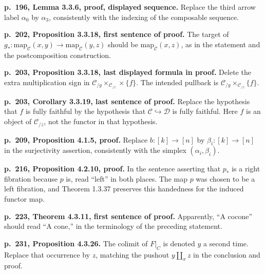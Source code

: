 \par{}
\noindent\textbf{p.~196, Lemma 3.3.6, proof, displayed sequence.}\enspace
Replace the third arrow label $\alpha_0$ by $\alpha_3$, consistently with the indexing of the composable sequence.

\par{}
\noindent\textbf{p.~202, Proposition 3.3.18, first sentence of proof.}\enspace
The target of $g_*\colon\mathrm{map}_{\mathcal C}(x,y)\to\mathrm{map}_{\mathcal C}(y,z)$ should be $\mathrm{map}_{\mathcal C}(x,z)$, as in the statement and the postcomposition construction.

\par{}
\noindent\textbf{p.~203, Proposition 3.3.18, last displayed formula in proof.}\enspace
Delete the extra multiplication sign in $\mathcal C_{/g}\times_{\mathcal C_{/z}}\times\{f\}$. The intended pullback is $\mathcal C_{/g}\times_{\mathcal C_{/z}}\{f\}$.

\par{}
\noindent\textbf{p.~203, Corollary 3.3.19, last sentence of proof.}\enspace
Replace the hypothesis that $f$ is fully faithful by the hypothesis that $\mathcal C\hookrightarrow\mathcal D$ is fully faithful. Here $f$ is an object of $\mathcal C_{/z}$, not the functor in that hypothesis.

\par{}
\noindent\textbf{p.~209, Proposition 4.1.5, proof.}\enspace
Replace $b\colon[k]\to[n]$ by $\beta_i\colon[k]\to[n]$ in the surjectivity assertion, consistently with the simplex $(\alpha_i,\beta_i)$.

\par{}
\noindent\textbf{p.~216, Proposition 4.2.10, proof.}\enspace
In the sentence asserting that $p_*$ is a right fibration because $p$ is, read ``left'' in both places. The map $p$ was chosen to be a left fibration, and Theorem 1.3.37 preserves this handedness for the induced functor map.

\par{}
\noindent\textbf{p.~223, Theorem 4.3.11, first sentence of proof.}\enspace
Apparently, ``A cocone'' should read ``A cone,'' in the terminology of the preceding statement.

\par{}
\noindent\textbf{p.~231, Proposition 4.3.26.}\enspace
The colimit of $F|_C$ is denoted $y$ a second time. Replace that occurrence by $z$, matching the pushout $y\amalg_x z$ in the conclusion and proof.

